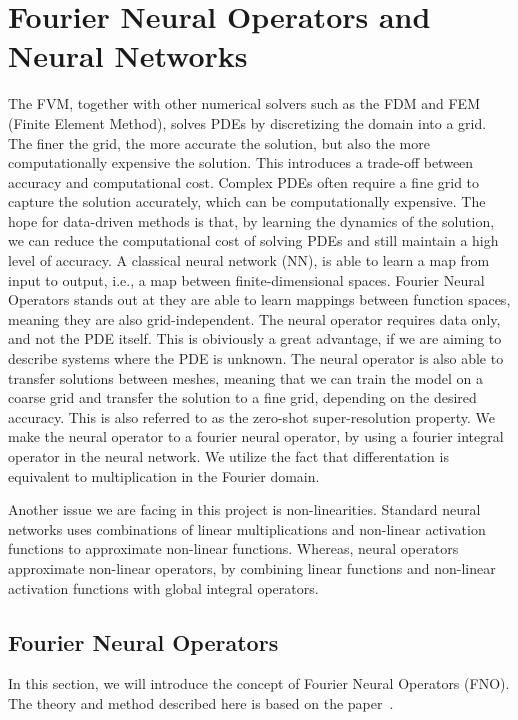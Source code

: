 \section{Fourier Neural Operators and Neural Networks}
The FVM, together with other numerical solvers such as the FDM and FEM (Finite Element Method), solves PDEs by discretizing the domain into a grid.
The finer the grid, the more accurate the solution, but also the more computationally expensive the solution. This introduces a trade-off between accuracy and computational cost.
Complex PDEs often require a fine grid to capture the solution accurately, which can be computationally expensive.
The hope for data-driven methods is that, by learning the dynamics of the solution, we can reduce the computational cost of solving PDEs and still maintain a high level of accuracy.
A classical neural network (NN), is able to learn a map from input to output, i.e., a map between finite-dimensional spaces.
Fourier Neural Operators stands out at they are able to learn mappings between function spaces, meaning they are also grid-independent.
The neural operator requires data only, and not the PDE itself.
This is obiviously a great advantage, if we are aiming to describe systems where the PDE is unknown. 
The neural operator is also able to transfer solutions between meshes, meaning that we can train the model on a coarse grid and transfer the solution to a fine grid, depending on the desired accuracy.
This is also referred to as the zero-shot super-resolution property.
We make the neural operator to a fourier neural operator, by using a fourier integral operator in the neural network.
We utilize the fact that differentation is equivalent to multiplication in the Fourier domain.

Another issue we are facing in this project is non-linearities.
Standard neural networks uses combinations of linear multiplications and non-linear activation functions to approximate non-linear functions.
Whereas, neural operators approximate non-linear operators, by combining linear functions and non-linear activation functions with global integral operators. 


\subsection{Fourier Neural Operators}
In this section, we will introduce the concept of Fourier Neural Operators (FNO).
The theory and method described here is based on the paper~\cite{FNO_2021}.

